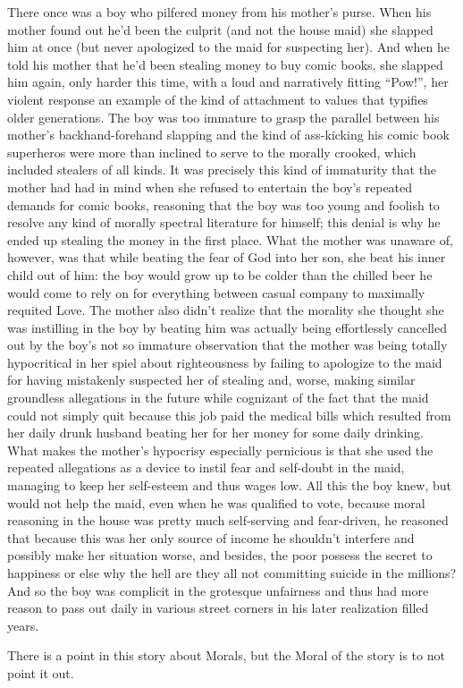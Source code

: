 \documentclass{article}
\begin{document}
\newline

There once was a boy who pilfered money from his mother's purse. When
his mother found out he'd been the culprit (and not the house maid) she
slapped him at once (but never apologized to the maid for suspecting
her). And when he told his mother that he'd been stealing money to buy
comic books, she slapped him again, only harder this time, with a loud
and narratively fitting ``Pow!'', her violent response an example of the
kind of attachment to values that typifies older generations. The boy
was too immature to grasp the parallel between his mother's
backhand-forehand slapping and the kind of ass-kicking his comic book
superheros were more than inclined to serve to the morally crooked,
which included stealers of all kinds. It was precisely this kind of
immaturity that the mother had had in mind when she refused to entertain
the boy's repeated demands for comic books, reasoning that the boy was
too young and foolish to resolve any kind of morally spectral literature
for himself; this denial is why he ended up stealing the money in the
first place. What the mother was unaware of, however, was that while
beating the fear of God into her son, she beat his inner child out of
him: the boy would grow up to be colder than the chilled beer he would
come to rely on for everything between casual company to maximally
requited Love. The mother also didn't realize that the morality she
thought she was instilling in the boy by beating him was actually being
effortlessly cancelled out by the boy's not so immature observation that
the mother was being totally hypocritical in her spiel about
righteousness by failing to apologize to the maid for having mistakenly
suspected her of stealing and, worse, making similar groundless
allegations in the future while cognizant of the fact that the maid
could not simply quit because this job paid the medical bills which
resulted from her daily drunk husband beating her for her money for some
daily drinking. What makes the mother's hypocrisy especially pernicious
is that she used the repeated allegations as a device to instil fear and
self-doubt in the maid, managing to keep her self-esteem and thus wages
low. All this the boy knew, but would not help the maid, even when he
was qualified to vote, because moral reasoning in the house was pretty
much self-serving and fear-driven, he reasoned that because this was
her only source of income he shouldn't interfere and possibly make her
situation worse, and besides, the poor possess the secret to happiness
or else why the hell are they all not committing suicide in the
millions? And so the boy was complicit in the grotesque unfairness and
thus had more reason to pass out daily in various street corners in his
later realization filled years.

\newline\newline

There is a point in this story about Morals, but the Moral of the story
is to not point it out.
\end{document}
